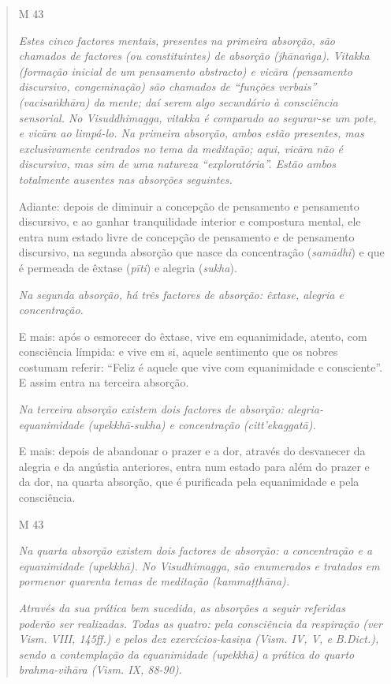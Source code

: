 \begin{quote}
M 43

\emph{Estes cinco factores mentais, presentes na primeira absorção, são chamados de factores (ou constituintes) de absorção (jhānaṅga). Vitakka (formação inicial de um pensamento abstracto) e vicāra (pensamento discursivo, congeminação) são chamados de ``funções verbais'' (vacisaṅkhāra) da mente; daí serem algo secundário à consciência sensorial. No Visuddhimagga, vitakka é comparado ao segurar-se um pote, e vicāra ao limpá-lo. Na primeira absorção, ambos estão presentes, mas exclusivamente centrados no tema da meditação; aqui, vicāra não é discursivo, mas sim de uma natureza ``exploratória''. Estão ambos totalmente ausentes nas absorções seguintes.}

Adiante: depois de diminuir a concepção de pensamento e pensamento discursivo, e ao ganhar tranquilidade interior e compostura mental, ele entra num estado livre de concepção de pensamento e de pensamento discursivo, na segunda absorção que nasce da concentração (\emph{samādhi}) e que é permeada de êxtase (\emph{pīti}) e alegria (\emph{sukha}).

\emph{Na segunda absorção, há três factores de absorção: êxtase, alegria e concentração.}

E mais: após o esmorecer do êxtase, vive em equanimidade, atento, com consciência límpida: e vive em si, aquele sentimento que os nobres costumam referir: ``Feliz é aquele que vive com equanimidade e consciente''. E assim entra na terceira absorção.

\emph{Na terceira absorção existem dois factores de absorção: alegria-equanimidade (upekkhā-sukha) e concentração (citt'ekaggatā).}

E mais: depois de abandonar o prazer e a dor, através do desvanecer da alegria e da angústia anteriores, entra num estado para além do prazer e da dor, na quarta absorção, que é purificada pela equanimidade e pela consciência.

M 43

\emph{Na quarta absorção existem dois factores de absorção: a concentração e a equanimidade (upekkhā). No Visudhimagga, são enumerados e tratados em pormenor quarenta temas de meditação (kammaṭṭhāna).}

\emph{Através da sua prática bem sucedida, as absorções a seguir referidas poderão ser realizadas. Todas as quatro: pela consciência da respiração (ver Vism. VIII, 145ff.) e pelos dez exercícios-kasiṇa (Vism. IV, V, e B.Dict.), sendo a contemplação da equanimidade (upekkhā) a prática do quarto brahma-vihāra (Vism. IX, 88-90).}


\end{quote}
